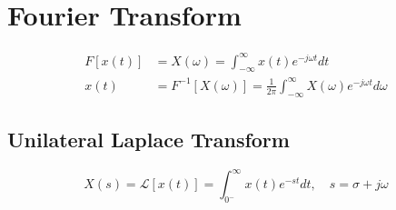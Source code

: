 \section{Fourier Transform}
\begin{align*}
F\left[x(t)\right] &= X(\omega) = \int_{-\infty}^{\infty}x(t)e^{-j\omega t}dt \\
x(t) &= F^{-1}\left[X(\omega)\right] = \frac{1}{2\pi}\int_{-\infty}^{\infty}X(\omega)e^{-j\omega t}d\omega
\end{align*}

\subsection{Unilateral Laplace Transform}

\[X(s)=\mathcal{L}\left[x(t)\right]=\int_{0^-}^{\infty}x(t)e^{-st}dt, \quad s=\sigma+j\omega\]